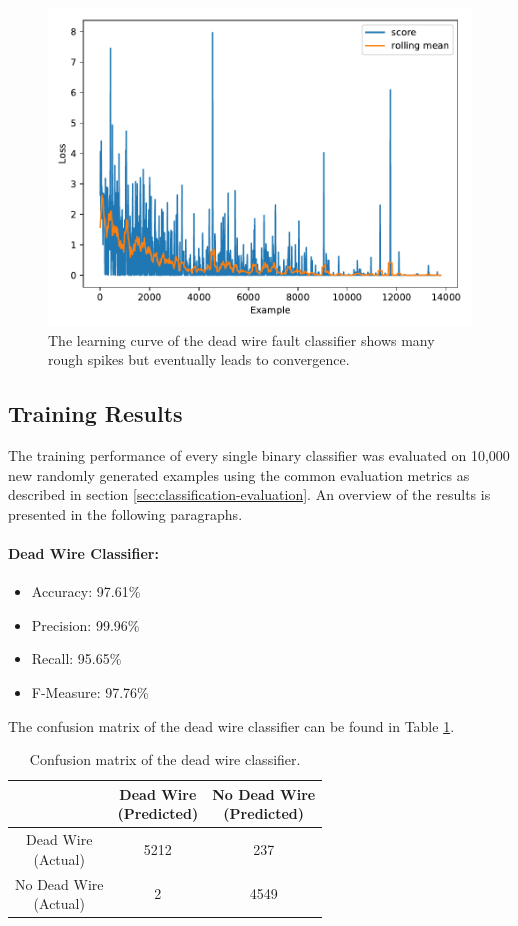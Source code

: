 \begin{figure}[h]
  \centering
  \includegraphics[width=.8\textwidth]{../figures/score_test}
  \caption{The learning curve of the dead wire fault classifier
    shows many rough spikes but eventually leads to convergence.}
  \label{fig:learning-curve}
\end{figure}

\clearpage

\subsection{Training Results}

The training performance of every single binary classifier was
evaluated on 10,000 new randomly generated
examples using the common evaluation metrics as described in section
\ref{sec:classification-evaluation}. An overview of the results is
presented in the following paragraphs.

\paragraph{Dead Wire Classifier:}
\begin{itemize}
  \item Accuracy: 97.61\%
  \item Precision: 99.96\%
  \item Recall: 95.65\%
  \item F-Measure: 97.76\%
\end{itemize}
The confusion matrix of the dead wire classifier can be found in Table
\ref{tbl:confusion-deadwire}.
\begin{table}[h]
  \centering
  \renewcommand\theadfont{\bfseries}
  \begin{tabular}{|c|c|c|}
    \hline
    & \thead{Dead Wire\\(Predicted)} & \thead{No Dead Wire\\(Predicted)} \\
    \hline
    \thead{Dead Wire\\(Actual)} & 5212 & 237\\
    \hline
    \thead{No Dead Wire\\(Actual)} & 2 & 4549\\
    \hline
  \end{tabular}
  \caption{Confusion matrix of the dead wire classifier.}
  \label{tbl:confusion-deadwire}
\end{table}

